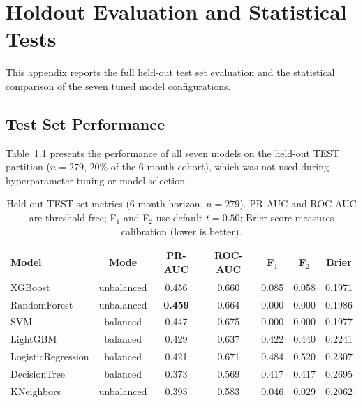 \chapter{Holdout Evaluation and Statistical Tests}
\label{app:holdout}

This appendix reports the full held-out test set evaluation and the statistical comparison of the seven tuned model configurations.

\section{Test Set Performance}
\label{app:test_metrics}

Table~\ref{tab:app_test_metrics} presents the performance of all seven models on the held-out TEST partition ($n{=}279$, 20\% of the 6-month cohort), which was not used during hyperparameter tuning or model selection.

\begin{table}[htbp]
\centering
\caption[TEST set metrics, all 7 models (appendix)]{Held-out TEST set metrics (6-month horizon, $n{=}279$). PR-AUC and ROC-AUC are threshold-free; F$_1$ and F$_2$ use default $t{=}0.50$; Brier score measures calibration (lower is better).}
\label{tab:app_test_metrics}
\small
\begin{tabular}{l c c c c c c}
\toprule
Model & Mode & PR-AUC & ROC-AUC & F$_1$ & F$_2$ & Brier \\
\midrule
  XGBoost          & unbalanced & 0.456 & 0.660 & 0.085 & 0.058 & 0.1971 \\
  RandomForest     & unbalanced & \textbf{0.459} & 0.664 & 0.000 & 0.000 & 0.1986 \\
  SVM              & balanced   & 0.447 & 0.675 & 0.000 & 0.000 & 0.1977 \\
  LightGBM         & balanced   & 0.429 & 0.637 & 0.422 & 0.440 & 0.2241 \\
  LogisticRegression & balanced & 0.421 & 0.671 & 0.484 & 0.520 & 0.2307 \\
  DecisionTree     & balanced   & 0.373 & 0.569 & 0.417 & 0.417 & 0.2695 \\
  KNeighbors       & unbalanced & 0.393 & 0.583 & 0.046 & 0.029 & 0.2062 \\
\bottomrule
\end{tabular}
\end{table}



